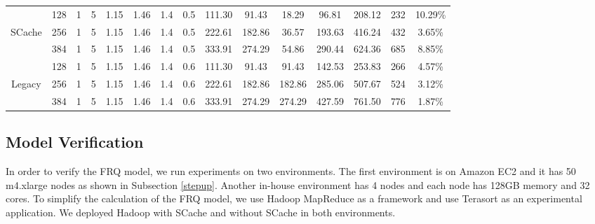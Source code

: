 {\begin{table}[!t]
{\begin{tabular}{|c||c|c|c|c|c|c|c||c|c|c|c|c|c|c|}
	\hline
	& 128	& 1 & 5 &	1.15 &	1.46	&	1.4 &	0.5 &	111.30 &	91.43	&	18.29	&	96.81	&	208.12	&	232	&	10.29\%	\\
	SCache
	& 256	& 1 & 5 &	1.15 &	1.46	&	1.4 &	0.5 &	222.61 &	182.86	&	36.57	&	193.63	&	416.24	&	432	&	3.65\%	\\
	& 384	& 1 & 5 &	1.15 &	1.46	&	1.4 &	0.5 &	333.91 &	274.29	&	54.86	&	290.44	&	624.36	&	685 &	8.85\%	\\
	\hline
	& 128	& 1 & 5 &	1.15 &	1.46	&	1.4 &	0.6 &	111.30 &	91.43	&	91.43	&	142.53	&	253.83	&	266 &	4.57\%	\\
	Legacy
	& 256	& 1 & 5 &	1.15 &	1.46	&	1.4 &	0.6 &	222.61 &	182.86	&	182.86	&	285.06	&	507.67	&	524 &	3.12\%	\\
	& 384	& 1 & 5 &	1.15 &	1.46	&	1.4 &	0.6 &	333.91 &	274.29	&	274.29	&	427.59	&	761.50	&	776 &	1.87\%	\\

	\hline
	\end{tabular}
}
\end{table}

\subsection{Model Verification}\label{model_verification}
In order to verify the FRQ model, we run experiments on two environments. The first environment is on Amazon EC2 and it has 50 m4.xlarge nodes as shown in Subsection \ref{stepup}. Another in-house environment has 4 nodes and each node has 128GB memory and 32 cores. To simplify the calculation of the FRQ model, we use Hadoop MapReduce as a framework and use Terasort as an experimental application. We deployed Hadoop with SCache and without SCache in both environments.

}
